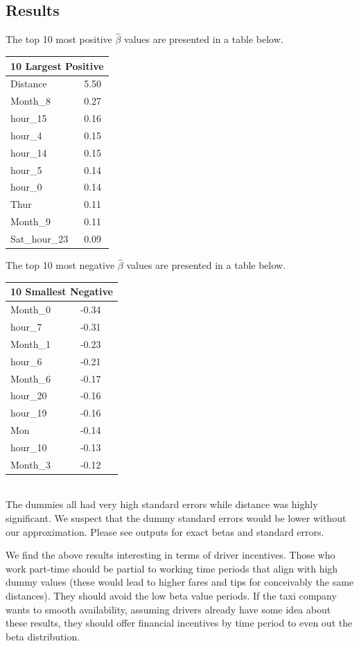 \documentclass[twoside]{article}
\begin{document}
\begin{multicols}{2}
\subsection{Results}

The top 10 most positive $\hat{\beta}$ values are presented in a table below. 

\begin{tabular}{ |l|l| }
  \hline
  \multicolumn{2}{|c|}{10 Largest Positive} \\
  \hline
Distance &	5.50 \\
 Month\_8  &	0.27\\
 hour\_15 &	0.16\\
 hour\_4 &	0.15\\
 hour\_14 &	0.15\\
 hour\_5 &	0.14\\
 hour\_0 &	0.14\\
 Thur &	0.11\\
 Month\_9 &	0.11\\
 Sat\_hour\_23 & 	0.09\\
  \hline
\end{tabular}

The top 10 most negative $\hat{\beta}$ values are presented in a table below. \\

\begin{tabular}{ |l|l| }
  \hline
  \multicolumn{2}{|c|}{10 Smallest Negative} \\
  \hline
 Month\_0 &	-0.34\\
 hour\_7 &	-0.31\\
 Month\_1 &	-0.23\\
 hour\_6 & 	-0.21\\
 Month\_6 &	-0.17\\
 hour\_20 &	-0.16\\
 hour\_19 &	-0.16\\
 Mon &	-0.14\\
 hour\_10 &	-0.13\\
 Month\_3 &	-0.12\\
  \hline
\end{tabular}\\


The dummies all had very high standard errors while distance was highly significant. We suspect that the dummy standard errors would be lower without our approximation.  Please see outputs for exact betas and standard errors.

We find the above results interesting in terms of driver incentives. Those who work part-time should be partial to working time periods that align with high dummy values (these would lead to higher fares and tips for conceivably the same distances). They should avoid the low beta value periods. If the taxi company wants to smooth availability, assuming drivers already have some idea about these results, they should offer financial incentives by time period to even out the beta distribution. 


\end{multicols}
\end{document}
